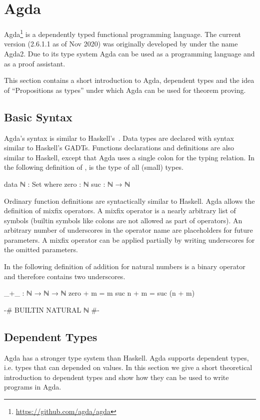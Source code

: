 
\section{Agda}

Agda\footnote{\url{https://github.com/agda/agda}} is a dependently typed
functional programming language.
The current version (2.6.1.1 as of Nov 2020) was originally developed by
\textcite{norell:thesis} under the name Agda2.
Due to its type system Agda can be used as a programming language and as a proof
assistant.

This section contains a short introduction to Agda, dependent types and the idea
of ``Propositions as types'' under which Agda can be used for theorem proving.

\subsection{Basic Syntax}

Agda's syntax is similar to Haskell's~\cite{Haskell98}.
Data types are declared with syntax similar to Haskell's GADTs.
Functions declarations and definitions are also similar to Haskell, except that
Agda uses a single colon for the typing relation.
In the following definition of ,  is the type
of all (small) types.

\begin{code}
data ℕ : Set where
  zero  : ℕ
  suc   : ℕ → ℕ
\end{code}
Ordinary function definitions are syntactically similar to Haskell.
Agda allows the definition of mixfix operators.
A mixfix operator is a nearly arbitrary list of symbols (builtin symbols like
colons are not allowed as part of operators).
An arbitrary number of underscores in the operator name are placeholders for
future parameters.
A mixfix operator can be applied partially by writing underscores for the
omitted parameters.

In the following definition of addition for natural numbers \AgdaFunction{+} is
a binary operator and therefore contains two underscores.

\begin{code}
_+_ : ℕ → ℕ → ℕ
zero   + m = m
suc n  + m = suc (n + m)
\end{code}
\begin{code}[hide]
{-# BUILTIN NATURAL ℕ #-}
\end{code}

\subsection{Dependent Types}
\label{preliminaries:dependent-types}
Agda has a stronger type system than Haskell.
Agda supports dependent types, i.e. types that can depended on values.
In this section we give a short theoretical introduction to dependent types and
show how they can be used to write programs in Agda.

